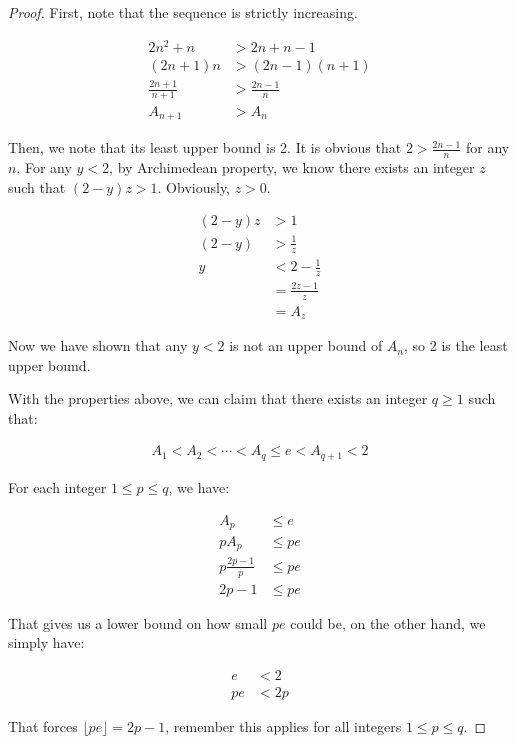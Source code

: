 \begin{proof}
First, note that the sequence is strictly increasing.

\begin{align*}
          2n^2 + n &> 2n + n - 1       \\
         (2n + 1)n &> (2n - 1)(n + 1)  \\
  \frac{2n+1}{n+1} &> \frac{2n - 1}{n} \\
           A_{n+1} &> A_n
\end{align*}

Then, we note that its least upper bound is 2. It is obvious that $ 2 > \frac{2n-1}{n} $ for any $ n $. For any $ y < 2 $, by Archimedean property, we know there exists an integer $ z $ such that $ (2 - y)z > 1 $. Obviously, $ z > 0 $.

\begin{align*}
    (2-y)z &> 1           \\
    (2-y) &> \frac{1}{z}  \\
    y &< 2 - \frac{1}{z}  \\
      &= \frac{2z - 1}{z} \\
      &= A_z
\end{align*}

Now we have shown that any $ y < 2 $ is not an upper bound of $ A_n $, so 2 is the least upper bound.

With the properties above, we can claim that there exists an integer $ q \ge 1 $ such that:

\begin{align*}
    A_1 < A_2 < \cdots < A_q \le e < A_{q+1} < 2
\end{align*}

For each integer $ 1 \le p \le q $, we have:

\begin{align*}
               A_p &\le e  \\
              pA_p &\le pe \\
  p\frac{2p -1}{p} &\le pe \\
            2p - 1 &\le pe
\end{align*}

That gives us a lower bound on how small $ pe $ could be, on the other hand, we simply have:

\begin{align*}
     e &< 2  \\
    pe &< 2p
\end{align*}

That forces $ \lfloor pe \rfloor = 2p - 1 $, remember this applies for all integers $ 1 \le p \le q $.


\end{proof}
